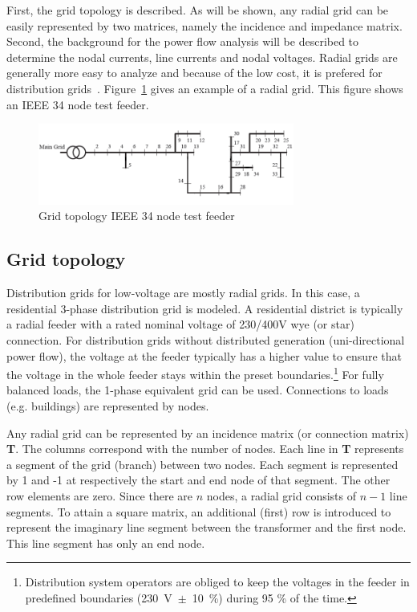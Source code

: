 First, the grid topology is described. As will be shown, any radial grid can be easily represented by two matrices, namely the incidence and impedance matrix. Second, the background for the power flow analysis will be described to determine the nodal currents, line currents and nodal voltages. Radial grids are generally more easy to analyze and because of the low cost, it is prefered for distribution grids~\cite{ehaesen}. Figure~\ref{figIEEE} gives an example of a radial grid. This figure shows an IEEE 34 node test feeder.

\begin{figure}[ht]
\centerline{\includegraphics[width=0.75\textwidth, angle=0]{Electric/MyGraphics/grid_ieee34.png}}
\caption{Grid topology IEEE 34 node test feeder~\cite{IEEE_testfeeder}}
\label{figIEEE}
\end{figure}

\subsection{Grid topology}
Distribution grids for low-voltage are mostly radial grids. In this case, a residential 3-phase distribution grid is modeled. A residential district is typically a radial feeder with a rated nominal voltage of 230/400V wye (or star) connection. For distribution grids without distributed generation (uni-directional power flow), the voltage at the feeder typically has a higher value to ensure that the voltage in the whole feeder stays within the preset boundaries.\footnote{Distribution system operators are obliged to keep the voltages in the feeder in predefined boundaries \mbox{(230 V $\pm$ 10 \%)} during 95 \% of the time.} For fully balanced loads, the 1-phase equivalent grid can be used. Connections to loads (e.g. buildings) are represented by nodes.

Any radial grid can be represented by an incidence matrix (or connection matrix) \textbf{T}. The columns correspond with the number of nodes. Each line in \textbf{T} represents a segment of the grid (branch) between two nodes. Each segment is represented by 1 and -1 at respectively the start and end node of that segment. The other row elements are zero. Since there are $n$ nodes, a radial grid consists of $n-1$ line segments. To attain a square matrix, an additional (first) row is introduced to represent the imaginary line segment between the transformer and the first node. This line segment has only an end node.

